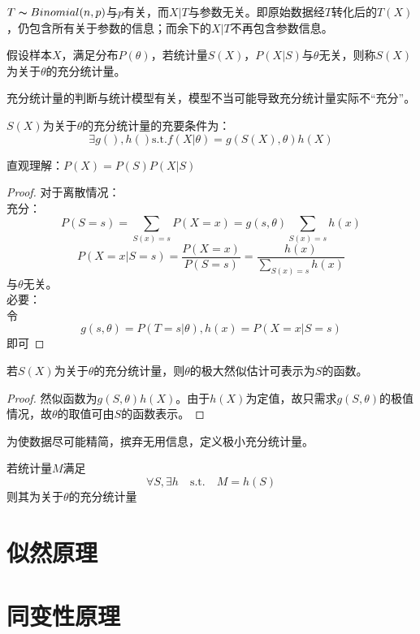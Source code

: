 \begin{remark}
	$T \thicksim Binomial(n,p)$与$p$有关，而$X|T$与参数无关。即原始数据经$T$转化后的$T(X)$，仍包含所有关于参数的信息；而余下的$X|T$不再包含参数信息。
\end{remark}

\begin{definition}[充分统计量]
	假设样本$X$，满足分布$P(\theta)$，若统计量$S(X)$，$P(X|S)$与$\theta$无关，则称$S(X)$为关于$\theta$的充分统计量。
\end{definition}

\begin{remark}
	充分统计量的判断与统计模型有关，模型不当可能导致充分统计量实际不“充分”。
\end{remark}

\begin{theorem}[分解定理]
	$S(X)$为关于$\theta$的充分统计量的充要条件为：
	$$\exists g(),h() \text{s.t.} f(X|\theta)=g(S(X),\theta)h(X)$$
\end{theorem}

\begin{remark}
	直观理解：$P(X)=P(S)P(X|S)$
\end{remark}

\begin{proof}
	对于离散情况：\\
	充分：
	$$P(S=s)=\sum_{S(x)=s}P(X=x)=g(s,\theta)\sum_{S(x)=s}h(x)$$
	$$P(X=x|S=s)=\frac{P(X=x)}{P(S=s)}=\frac{h(x)}{\sum_{S(x)=s}h(x)}$$
	与$\theta$无关。\\
	必要：\\
	令$$g(s,\theta)=P(T=s|\theta),h(x)=P(X=x|S=s)$$即可
\end{proof}

\begin{theorem}
	若$S(X)$为关于$\theta$的充分统计量，则$\theta$的极⼤然似估计可表示为$S$的函数。
\end{theorem}

\begin{proof}
	然似函数为$g(S,\theta)h(X)$。由于$h(X)$为定值，故只需求$g(S,\theta)$的极值情况，故$\theta$的取值可由$S$的函数表示。
\end{proof}

为使数据尽可能精简，摈弃无用信息，定义极小充分统计量。

\begin{definition}[极小充分统计量]
	若统计量$M$满足
	$$\forall S, \exists h  \quad \text{s.t.} \quad
	 M=h(S) $$
	则其为关于$\theta$的充分统计量
\end{definition}

\section{似然原理}

\section{同变性原理}

